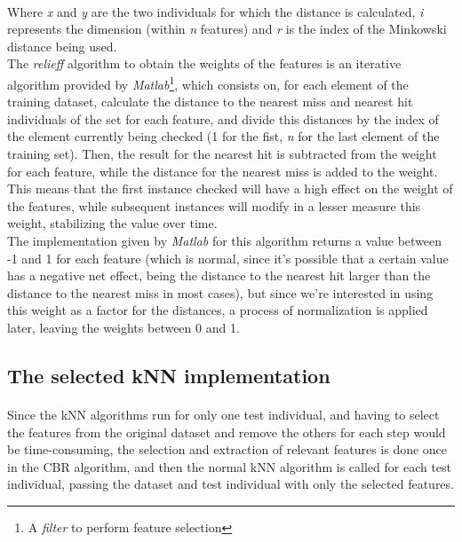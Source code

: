 \documentclass[12pt, a4paper]{article}
\begin{document}
\paragraph{}Where \emph{x} and \emph{y} are the two individuals for which the distance is calculated, \emph{i} represents the dimension (within \emph{n} features) and \emph{r} is the index of the Minkowski distance being used.\\

The \emph{relieff} algorithm to obtain the weights of the features is an iterative algorithm provided by \emph{Matlab}\footnote{A \emph{filter} to perform feature selection}, which consists on, for each element of the training dataset, calculate the distance to the nearest miss and nearest hit individuals of the set for each feature, and divide this distances by the index of the element currently being checked (1 for the fist, \emph{n} for the last element of the training set). Then, the result for the nearest hit is subtracted from the weight for each feature, while the distance for the nearest miss is added to the weight.\\

This means that the first instance checked will have a high effect on the weight of the features, while subsequent instances will modify in a lesser measure this weight, stabilizing the value over time.\\

The implementation given by \emph{Matlab} for this algorithm returns a value between -1 and 1 for each feature (which is normal, since it’s possible that a certain value has a negative net effect, being the distance to the nearest hit larger than the distance to the nearest miss in most cases), but since we’re interested in using this weight as a factor for the distances, a process of normalization is applied later, leaving the weights between 0 and 1.
\subsection{The selected kNN implementation} %
\label{sub:the_selected_knn_implementation}
\paragraph{}Since the kNN algorithms run for only one test individual, and having to select the features from the original dataset and remove the others for each step would be time-consuming, the selection and extraction of relevant features is done once in the CBR algorithm, and then the normal kNN algorithm is called for each test individual, passing the dataset and test individual with only the selected features.\\
\end{document}
